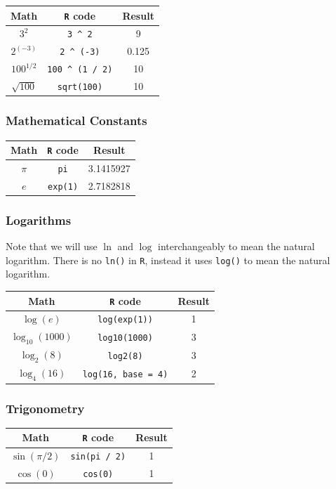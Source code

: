 \documentclass[]{book}
\begin{document}
\begin{longtable}[]{@{}ccc@{}}
\toprule
Math & \texttt{R} code & Result\tabularnewline
\midrule
\endhead
\(3^2\) & \texttt{3\ \^{}\ 2} & 9\tabularnewline
\(2^{(-3)}\) & \texttt{2\ \^{}\ (-3)} & 0.125\tabularnewline
\(100^{1/2}\) & \texttt{100\ \^{}\ (1\ /\ 2)} & 10\tabularnewline
\(\sqrt{100}\) & \texttt{sqrt(100)} & 10\tabularnewline
\bottomrule
\end{longtable}

\hypertarget{mathematical-constants}{%
\subsubsection*{Mathematical Constants}\label{mathematical-constants}}

\begin{longtable}[]{@{}ccc@{}}
\toprule
Math & \texttt{R} code & Result\tabularnewline
\midrule
\endhead
\(\pi\) & \texttt{pi} & 3.1415927\tabularnewline
\(e\) & \texttt{exp(1)} & 2.7182818\tabularnewline
\bottomrule
\end{longtable}

\hypertarget{logarithms}{%
\subsubsection*{Logarithms}\label{logarithms}}

Note that we will use \(\ln\) and \(\log\) interchangeably to mean the natural logarithm. There is no \texttt{ln()} in \texttt{R}, instead it uses \texttt{log()} to mean the natural logarithm.

\begin{longtable}[]{@{}ccc@{}}
\toprule
Math & \texttt{R} code & Result\tabularnewline
\midrule
\endhead
\(\log(e)\) & \texttt{log(exp(1))} & 1\tabularnewline
\(\log_{10}(1000)\) & \texttt{log10(1000)} & 3\tabularnewline
\(\log_{2}(8)\) & \texttt{log2(8)} & 3\tabularnewline
\(\log_{4}(16)\) & \texttt{log(16,\ base\ =\ 4)} & 2\tabularnewline
\bottomrule
\end{longtable}

\hypertarget{trigonometry}{%
\subsubsection*{Trigonometry}\label{trigonometry}}

\begin{longtable}[]{@{}ccc@{}}
\toprule
Math & \texttt{R} code & Result\tabularnewline
\midrule
\endhead
\(\sin(\pi / 2)\) & \texttt{sin(pi\ /\ 2)} & 1\tabularnewline
\(\cos(0)\) & \texttt{cos(0)} & 1\tabularnewline
\bottomrule
\end{longtable}
\end{document}
